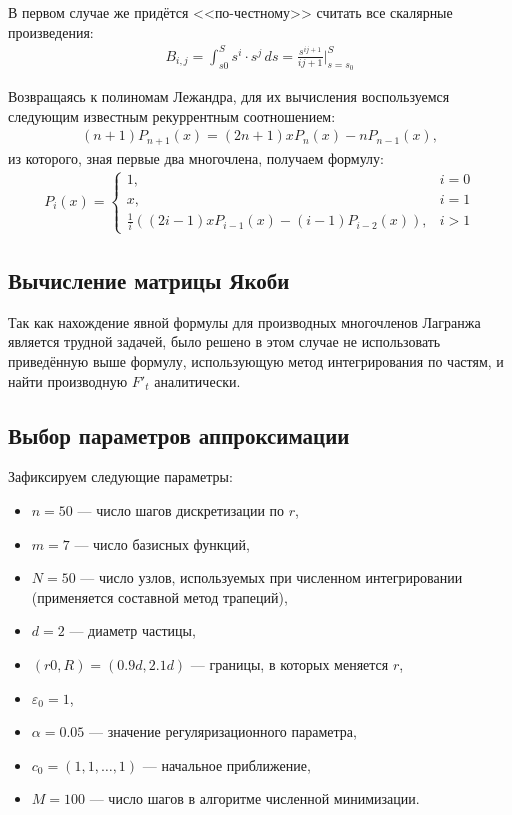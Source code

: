 \documentclass[a4paper,14pt]{extarticle}
\begin{document}
    В первом случае же придётся <<по-честному>> считать все скалярные произведения:
    \begin{gather*}
        B_{i, j} =
        \int_{s0}^{S}
        s^i \cdot s^j \, ds
        = \frac{s^{ij + 1}}{ij + 1} \bigg|_{s = s_0}^S
    \end{gather*}

    Возвращаясь к полиномам Лежандра, для их вычисления воспользуемся следующим
    известным рекуррентным соотношением:
    \begin{gather*}
        (n + 1) P_{n+1}(x)
        = (2 n + 1) x P_n(x) - n P_{n-1}(x),
    \end{gather*}
    из которого, зная первые два многочлена, получаем формулу:
    \begin{gather*}
        P_i(x) =
        \begin{cases}
            1, & i = 0 \\
            x, & i = 1 \\
            \frac{1}{i} (
                (2i - 1) x P_{i-1}(x) -
                (i - 1) P_{i - 2}(x)
            ), & i > 1
        \end{cases}
    \end{gather*}

    \subsection{Вычисление матрицы Якоби}

    Так как нахождение явной формулы для производных многочленов Лагранжа
    является трудной задачей, было решено в этом случае не использовать
    приведённую выше формулу, использующую метод интегрирования по частям,
    и найти производную $F'_t$ аналитически.

    \subsection{Выбор параметров аппроксимации}

    Зафиксируем следующие параметры:
    \begin{itemize}
        \item $n = 50$ --- число шагов дискретизации по $r$,
        \item $m = 7$ --- число базисных функций,
        \item $N = 50$ --- число узлов, используемых при численном
        интегрировании (применяется составной метод трапеций),
        \item $d = 2$ --- диаметр частицы,
        \item $(r0, R) = (0.9 d, 2.1 d)$ --- границы, в которых меняется $r$,
        \item $\varepsilon_0 = 1$,
        \item $\alpha = 0.05$ --- значение регуляризационного параметра,
        \item $c_0 = (1, 1, \ldots, 1)$ --- начальное приближение,
        \item $M = 100$ --- число шагов в алгоритме численной минимизации.
    \end{itemize}
\end{document}
